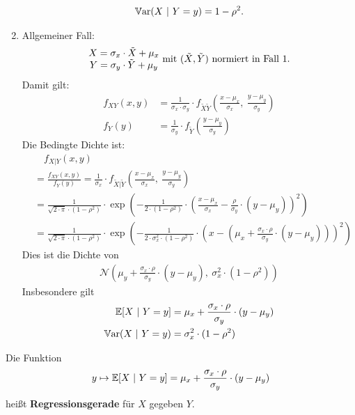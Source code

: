 \begin{beisp}
\begin{enumerate}
\begin{align*}
			\Var(X~|~Y=y)=1-\rho^2.
		\end{align*}
		\item Allgemeiner Fall:
		\begin{align*}
			\begin{matrix}
				X=\sigma_x\cdot\tilde{X}+\mu_x\\
				Y=\sigma_y\cdot\tilde{Y}+\mu_y
			\end{matrix}\mit(\tilde{X},\tilde{Y})\text{ normiert in Fall 1.}
		\end{align*}
		Damit gilt:
		\begin{align*}
			f_{XY}(x,y) 
			&=\frac{1}{\sigma_x\cdot\sigma_y}\cdot f_{\tilde{X}\tilde{Y}}\left(\frac{x-\mu_x}{\sigma_x},~\frac{y-\mu_y}{\sigma_y}\right)\\
			f_Y(y) &= \frac{1}{\sigma_y}\cdot f_{\tilde{Y}}\left(\frac{y-\mu_y}{\sigma_y}\right)
		\end{align*}
		Die Bedingte Dichte ist:
		\begin{align*}
			&\quad f_{X|Y}(x,y) \\
			&=\frac{f_{XY}(x,y)}{f_Y(y)}
			=\frac{1}{\sigma_x}\cdot f_{\tilde{X}|\tilde{Y}}\left(\frac{x-\mu_x}{\sigma_x},~\frac{y-\mu_y}{\sigma_y}\right)\\
			&=\frac{1}{\sqrt{2\cdot\pi}\cdot(1-\rho^2)}\cdot\exp\left(-\frac{1}{2\cdot(1-\rho^2)}\cdot\left(\frac{x-\mu_x}{\sigma_x}-\frac{\rho}{\sigma_y}\cdot(y-\mu_y)\right)^2\right)\\
			&=\frac{1}{\sqrt{2\cdot\pi}\cdot(1-\rho^2)}\cdot\exp\left(-\frac{1}{2\cdot\sigma_x^2\cdot(1-\rho^2)}\cdot\left(x-\left(\mu_x+\frac{\sigma_x\cdot\rho}{\sigma_y}\cdot(y-\mu_y)\right)\right)^2\right)
		\end{align*}
		Dies ist die Dichte von
		\begin{align*}
			\mathcal{N}\left(\mu_y+\frac{\sigma_x\cdot\rho}{\sigma_y}\cdot(y-\mu_y),~\sigma_x^2\cdot(1-\rho^2)\right)
		\end{align*}
		Insbesondere gilt
		\begin{align*}
			\E[X~|~Y=y]&=\mu_x+\frac{\sigma_x\cdot\rho}{\sigma_y}\cdot(y-\mu_y)\\
			\Var(X~|~Y=y)&=\sigma_x^2\cdot(1-\rho^2)
		\end{align*}
	\end{enumerate}
\end{beisp}

\begin{bemerkung}
	Die Funktion
	\begin{align*}
		y\mapsto\E[X~|~Y=y]=\mu_x+\frac{\sigma_x\cdot\rho}{\sigma_y}\cdot(y-\mu_y)
	\end{align*}
	heißt \textbf{Regressionsgerade} für $X$ gegeben $Y$.
\end{bemerkung}

